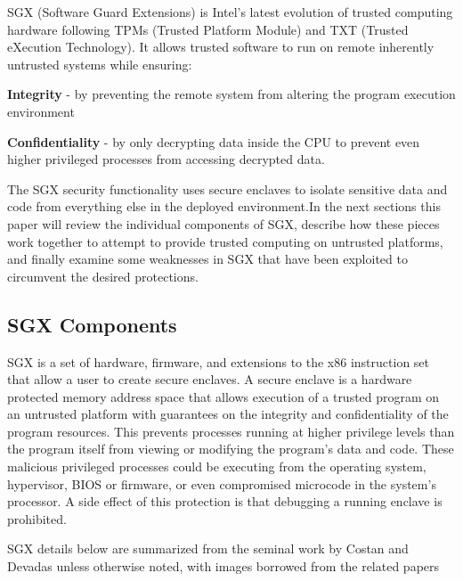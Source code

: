 SGX (Software Guard Extensions) is Intel's latest evolution of trusted computing hardware following TPMs (Trusted Platform Module) and TXT (Trusted eXecution Technology). It allows trusted software to run on remote inherently untrusted systems while ensuring:

\textbf{Integrity} - by preventing the remote system from altering the program execution environment

\textbf{Confidentiality} - by only decrypting data inside the CPU to prevent even higher privileged processes from accessing decrypted data.

The SGX security functionality uses secure enclaves to isolate sensitive data and code from everything else in the deployed environment.In the next sections this paper will review the individual components of SGX, describe how these pieces work together to attempt to provide trusted computing on untrusted platforms, and finally examine some weaknesses in SGX that have been exploited to circumvent the desired protections.


\subsection{SGX Components}


SGX is a set of hardware, firmware, and extensions to the x86 instruction set that allow a user to create secure enclaves. A secure enclave is a hardware protected memory address space that allows execution of a trusted program on an untrusted platform with guarantees on the integrity and confidentiality of the program resources. This prevents processes running at higher privilege levels than the program itself from viewing or modifying the program's data and code. These malicious privileged processes could be executing from the operating system, hypervisor, BIOS or firmware, or even compromised microcode in the system's processor. A side effect of this protection is that debugging a running enclave is prohibited. 

SGX details below are summarized from the seminal work by Costan and Devadas \cite{Costan_Devadas_2016} unless otherwise noted, with images borrowed from the related papers \cite{Sony_DRM, SGXinpractice,Xu_Cui_Peinado_2015,Shriraman_Dwarkadas_2010, Schwarz_Weiser_Gruss_Maurice_Mangard_2017, Rutkowska_Tereshkin_2007, Rozas_2013, Costan_Devadas_2016, Brickell_Li_2009}

